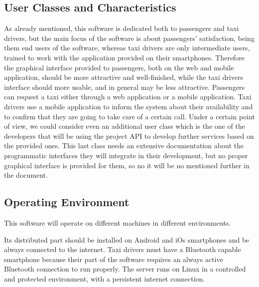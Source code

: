 \subsection{User Classes and Characteristics}
As already mentioned, this software is dedicated both to passengers and taxi drivers, but the main focus of the software is about passengers' satisfaction, being them end users of the software, whereas taxi drivers are only intermediate users, trained to work with the application provided on their smartphones.
Therefore the graphical interface provided to passengers, both on the web and mobile application, should be more attractive and well-finished, while the taxi drivers interface should more usable, and in general may be less attractive.
Passengers can request a taxi either through a web application or a mobile application.
Taxi drivers use a mobile application to inform the system about their availability and to confirm that they are going to take care of a certain call.
Under a certain point of view, we could consider even an additional user class which is the one of the developers that will be using the project API to develop further services based on the provided ones.
This last class needs an extensive documentation about the programmatic interfaces they will integrate in their development, but no proper graphical interface is provided for them, so no it will be no mentioned further in the document.
\subsection{Operating Environment}
This software will operate on different machines in different environments.\par
Its distributed part should be installed on Android and iOs smartphones and be always connected to the internet.
Taxi drivers must have a Bluetooth capable smartphone because their part of the software requires an always active Bluetooth connection to run properly.
The server runs on Linux in a controlled and protected environment, with a persistent internet connection.
